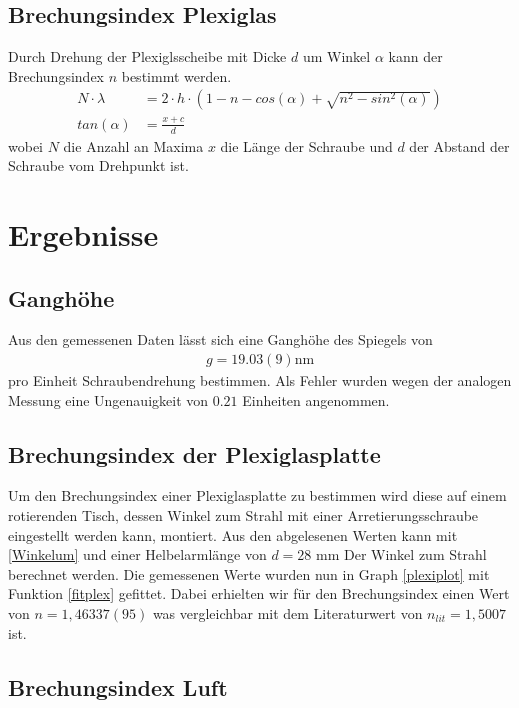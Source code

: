 \documentclass[11pt, a4paper]{article}
\begin{document}
    \subsection{Brechungsindex Plexiglas}
    Durch Drehung der Plexiglsscheibe mit Dicke $d$ um Winkel $\alpha$ kann der Brechungsindex $n$ bestimmt werden.
    \begin{align}
        N \cdot \lambda &= 2 \cdot h \cdot \left(1 - n - cos(\alpha) + \sqrt{n^2 - sin^2(\alpha)}\right)\label{fitplex} \\
        tan(\alpha) &= \frac{x + c}{d} \label{Winkelum}
    \end{align}
    wobei $N$ die Anzahl an Maxima $x$ die Länge der Schraube und $d$ der Abstand der Schraube vom Drehpunkt ist.

    \section{Ergebnisse}
    \subsection{Ganghöhe}

    Aus den gemessenen Daten lässt sich eine Ganghöhe des Spiegels von
    \begin{align}
        g = 19.03(9) \si{\nano\metre}
    \end{align}
    pro Einheit Schraubendrehung bestimmen. Als Fehler wurden wegen der analogen Messung eine Ungenauigkeit von $0.21$ Einheiten angenommen.  
        \subsection{Brechungsindex der Plexiglasplatte}
    Um den Brechungsindex einer Plexiglasplatte zu bestimmen wird diese auf einem rotierenden Tisch, dessen Winkel zum Strahl mit einer Arretierungsschraube eingestellt werden kann, montiert.
    Aus den abgelesenen Werten kann mit \ref{Winkelum} und einer Helbelarmlänge von $d = 28$ mm Der Winkel zum Strahl berechnet werden.
    Die gemessenen Werte wurden nun in Graph \ref{plexiplot} mit Funktion \ref{fitplex} gefittet. Dabei erhielten wir für den Brechungsindex 
    einen Wert von $n = 1,46337(95)$ was vergleichbar mit dem Literaturwert von $n_{lit} = 1,5007$ \cite[text]{keylist} ist.

    \subsection{Brechungsindex Luft}
\end{document}
